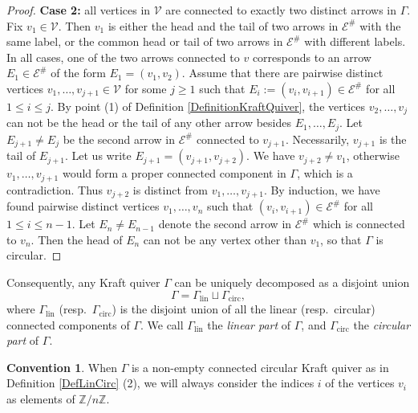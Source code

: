 \documentclass[12pt]{amsart}
\theoremstyle{definition}
\newtheorem{convention}[theorem]{Convention}
\newcommand{\<}{\langle}   %
\renewcommand{\>}{\rangle} %
\begin{document}
\begin{proof}
    \textbf{Case 2:} all vertices in $\mathcal V$ are connected to exactly two distinct arrows in $\Gamma$. Fix $v_1 \in \mathcal V$. Then $v_1$ is either the head and the tail of two arrows in $\mathcal E^{\#}$ with the same label, or the common head or tail of two arrows in $\mathcal E^{\#}$ with different labels. In all cases, one of the two arrows connected to $v$ corresponds to an arrow $E_1 \in \mathcal E^{\#}$ of the form $E_1 = (v_1,v_2)$. Assume that there are pairwise distinct vertices $v_1,\ldots ,v_{j+1} \in \mathcal V$ for some $j\geq 1$ such that $E_i := (v_i,v_{i+1}) \in \mathcal E^{\#}$ for all $1 \leq i \leq j$. By point (1) of Definition \ref{DefinitionKraftQuiver}, the vertices $v_2,\ldots , v_j$ can not be the head or the tail of any other arrow besides $E_1,\ldots , E_j$. Let $E_{j+1} \not = E_j$ be the second arrow in $\mathcal E^{\#}$ connected to $v_{j+1}$. Necessarily, $v_{j+1}$ is the tail of $E_{j+1}$. Let us write $E_{j+1} = (v_{j+1},v_{j+2})$. We have $v_{j+2} \not = v_1$, otherwise $v_1,\ldots , v_{j+1}$ would form a proper connected component in $\Gamma$, which is a contradiction. Thus $v_{j+2}$ is distinct from $v_1,\ldots , v_{j+1}$. By induction, we have found pairwise distinct vertices $v_1,\ldots , v_{n}$ such that $(v_i,v_{i+1}) \in \mathcal E^{\#}$ for all $1 \leq i \leq n-1$. Let $E_n \not = E_{n-1}$ denote the second arrow in $\mathcal E^{\#}$ which is connected to $v_{n}$. Then the head of $E_n$ can not be any vertex other than $v_1$, so that $\Gamma$ is circular.
\end{proof}

Consequently, any Kraft quiver $\Gamma$ can be uniquely decomposed as a disjoint union 
\begin{equation*}
    \Gamma = \Gamma_{\mathrm{lin}} \sqcup \Gamma_{\mathrm{circ}},
\end{equation*}
where $\Gamma_{\mathrm{lin}}$ (resp.~$\Gamma_{\mathrm{circ}}$) is the disjoint union of all the linear (resp.~circular) connected components of $\Gamma$. We call $\Gamma_{\mathrm{lin}}$ the \textit{linear part} of $\Gamma$, and $\Gamma_{\mathrm{circ}}$ the \textit{circular part} of $\Gamma$.

\begin{convention}
    When $\Gamma$ is a non-empty connected circular Kraft quiver as in Definition \ref{DefLinCirc} (2), we will always consider the indices $i$ of the vertices $v_i$ as elements of $\mathbb Z/n\mathbb Z$. 
\end{convention}
\end{document}

